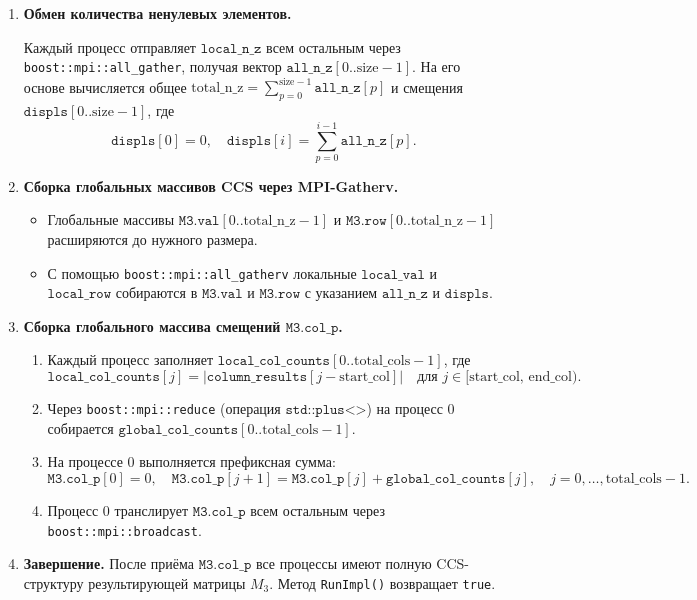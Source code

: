 \documentclass[12pt]{article}
\begin{document}
\begin{enumerate}
    \item \textbf{Обмен количества ненулевых элементов.}
    
    Каждый процесс отправляет \(\texttt{local\_n\_z}\) всем остальным через \texttt{boost::mpi::all\_gather}, получая вектор \(\texttt{all\_n\_z}[0..\text{size}-1]\). На его основе вычисляется общее \(\text{total\_n\_z} = \sum_{p=0}^{\text{size}-1} \texttt{all\_n\_z}[p]\) и смещения \(\texttt{displs}[0..\text{size}-1]\), где
    \[
        \texttt{displs}[0] = 0,\quad
        \texttt{displs}[i] = \sum_{p=0}^{i-1} \texttt{all\_n\_z}[p].
    \]

    \item \textbf{Сборка глобальных массивов CCS через MPI-Gatherv.}
    \begin{itemize}
        \item Глобальные массивы \(\texttt{M3.val}[0..\text{total\_n\_z}-1]\) и \(\texttt{M3.row}[0..\text{total\_n\_z}-1]\) расширяются до нужного размера.
        \item С помощью \texttt{boost::mpi::all\_gatherv} локальные \(\texttt{local\_val}\) и \(\texttt{local\_row}\) собираются в \(\texttt{M3.val}\) и \(\texttt{M3.row}\) с указанием \(\texttt{all\_n\_z}\) и \(\texttt{displs}\).
    \end{itemize}

    \item \textbf{Сборка глобального массива смещений \(\texttt{M3.col\_p}\).}
    \begin{enumerate}
        \item Каждый процесс заполняет \(\texttt{local\_col\_counts}[0..\text{total\_cols}-1]\), где
        \[
            \texttt{local\_col\_counts}[j] = \bigl|\texttt{column\_results}[j - \text{start\_col}]\bigr|
        \quad \text{для } j \in [\text{start\_col},\,\text{end\_col}).
        \]
        \item Через \texttt{boost::mpi::reduce} (операция \(\texttt{std::plus<>}\)) на процесс 0 собирается \(\texttt{global\_col\_counts}[0..\text{total\_cols}-1]\).
        \item На процессе 0 выполняется префиксная сумма:
        \[
            \texttt{M3.col\_p}[0] = 0,\quad
            \texttt{M3.col\_p}[j+1] = \texttt{M3.col\_p}[j] + \texttt{global\_col\_counts}[j],\quad
            j = 0,\dots,\text{total\_cols}-1.
        \]
        \item Процесс 0 транслирует \(\texttt{M3.col\_p}\) всем остальным через \texttt{boost::mpi::broadcast}.
    \end{enumerate}
    
    \item \textbf{Завершение.}  
    После приёма \(\texttt{M3.col\_p}\) все процессы имеют полную CCS-структуру результирующей матрицы \(M_3\). Метод \texttt{RunImpl()} возвращает \texttt{true}.
\end{enumerate}
\end{document}
